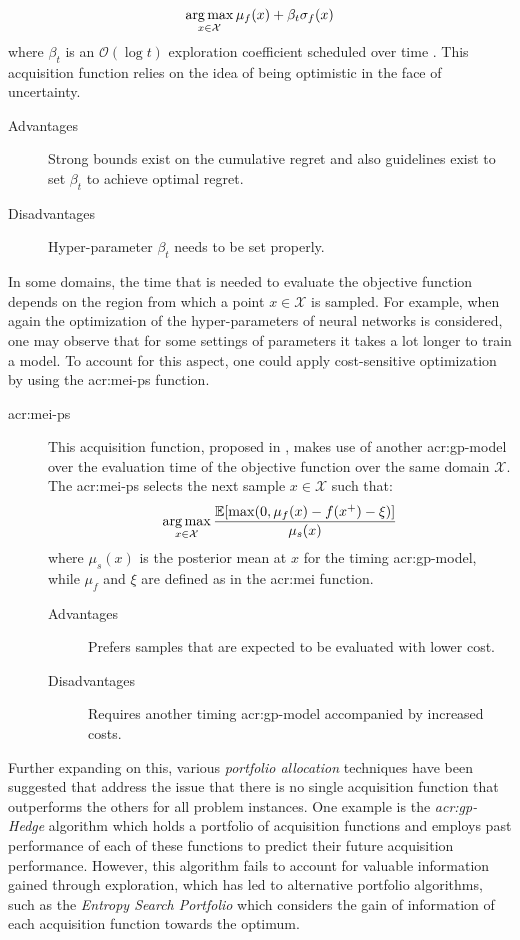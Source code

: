 \begin{description}
	$$\operatorname*{arg\,max}_{x \in \mathcal{X}} \mu_f(x) + \beta_t\sigma_f(x)$$
	where $\beta_t$ is an $\mathcal{O}(\log{t})$ exploration coefficient scheduled over time \cite{perchet2014gaussian}. This acquisition function relies on the idea of being optimistic in the face of uncertainty.
	\begin{description}
		\item[Advantages] Strong bounds exist on the cumulative regret and also guidelines exist to set $\beta_t$ to achieve optimal regret.
		\item[Disadvantages] Hyper-parameter $\beta_t$ needs to be set properly.
	\end{description}
\end{description}

In some domains, the time that is needed to evaluate the objective function depends on the region from which a point $x \in \mathcal{X}$ is sampled.
For example, when again the optimization of the hyper-parameters of neural networks is considered, one may observe that for some settings of parameters it takes a lot longer to train a model.
To account for this aspect, one could apply cost-sensitive optimization by using the \acrfull{acr:mei-ps} function.
\begin{description}
	\item[\acrfull{acr:mei-ps}] This acquisition function, proposed in \cite{snoek2012practical}, makes use of another \acrshort{acr:gp}-model over the evaluation time of the objective function over the same domain $\mathcal{X}$.
	The \acrshort{acr:mei-ps} selects the next sample $x \in \mathcal{X}$ such that:
	$$\operatorname*{arg\,max}_{x \in \mathcal{X}} \frac{\mathbb{E}[\max(0, \mu_f(x) - f(x^+) - \xi)]}{\mu_s(x)}$$
	where $\mu_s(x)$ is the posterior mean at $x$ for the timing \acrshort{acr:gp}-model, while $\mu_f$ and $\xi$ are defined as in the \acrshort{acr:mei} function.
	\begin{description}
		\item[Advantages] Prefers samples that are expected to be evaluated with lower cost.
		\item[Disadvantages] Requires another timing \acrshort{acr:gp}-model accompanied by increased costs.
	\end{description}
\end{description}

Further expanding on this, various \textit{portfolio allocation} techniques have been suggested that address the issue that there is no single acquisition function that outperforms the others for all problem instances.
One example is the \textit{\acrshort{acr:gp}-Hedge} algorithm \cite{brochu2010portfolio, shahriari2016taking} which holds a portfolio of acquisition functions and employs past performance of each of these functions to predict their future acquisition performance.
However, this algorithm fails to account for valuable information gained through exploration, which has led to alternative portfolio algorithms, such as the \textit{Entropy Search Portfolio} \cite{shahriari2016taking, wang2016optimization} which considers the gain of information of each acquisition function towards the optimum.

